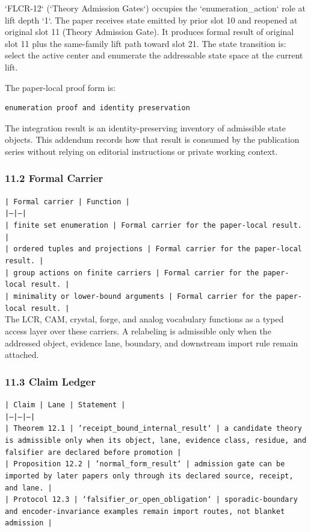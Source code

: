 \documentclass[11pt]{article}
\begin{document}
`FLCR-12` (`Theory Admission Gates`) occupies the `enumeration\_action` role at lift depth `1`.
The paper receives state emitted by prior slot 10 and reopened at original slot 11 (Theory Admission Gate). It produces formal result of original slot 11 plus the same-family lift path toward slot 21. The state transition is:
select the active center and enumerate the addressable state space at the current lift.

The paper-local proof form is:

\begin{verbatim}
enumeration proof and identity preservation
\end{verbatim}

The integration result is an identity-preserving inventory of admissible state objects. This addendum records how that result is
consumed by the publication series without relying on editorial instructions or
private working context.

\subsubsection*{11.2 Formal Carrier}

\noindent\texttt{| Formal carrier | Function |}\\
\noindent\texttt{|---|---|}\\
\noindent\texttt{| finite set enumeration | Formal carrier for the paper-local result. |}\\
\noindent\texttt{| ordered tuples and projections | Formal carrier for the paper-local result. |}\\
\noindent\texttt{| group actions on finite carriers | Formal carrier for the paper-local result. |}\\
\noindent\texttt{| minimality or lower-bound arguments | Formal carrier for the paper-local result. |}\\

The LCR, CAM, crystal, forge, and analog vocabulary functions as a typed access
layer over these carriers. A relabeling is admissible only when the addressed
object, evidence lane, boundary, and downstream import rule remain attached.

\subsubsection*{11.3 Claim Ledger}

\noindent\texttt{| Claim | Lane | Statement |}\\
\noindent\texttt{|---|---|---|}\\
\noindent\texttt{| Theorem 12.1 | `receipt\_bound\_internal\_result` | a candidate theory is admissible only when its object, lane, evidence class, residue, and falsifier are declared before promotion |}\\
\noindent\texttt{| Proposition 12.2 | `normal\_form\_result` | admission gate can be imported by later papers only through its declared source, receipt, and lane. |}\\
\noindent\texttt{| Protocol 12.3 | `falsifier\_or\_open\_obligation` | sporadic-boundary and encoder-invariance examples remain import routes, not blanket admission |}\\
\end{document}
